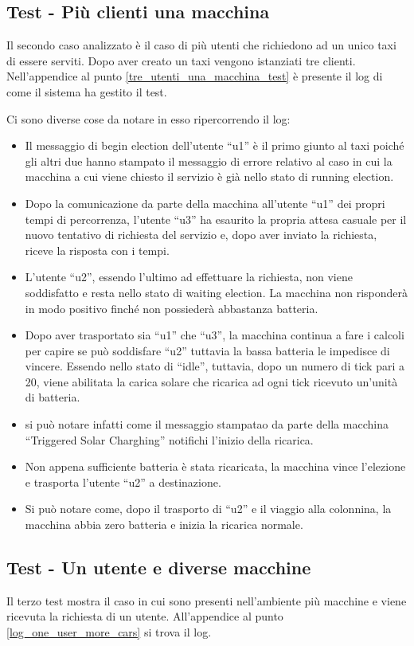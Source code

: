 \subsection{Test - Più clienti una macchina}
Il secondo caso analizzato è il caso di più utenti che richiedono ad un unico taxi di essere serviti. Dopo aver creato un taxi vengono istanziati tre clienti. Nell'appendice al punto \ref{tre_utenti_una_macchina_test} è presente il log di come il sistema ha gestito il test. 

Ci sono diverse cose da notare in esso ripercorrendo il log:
\begin{itemize}
	\item Il messaggio di begin election dell'utente ``u1'' è il primo giunto al taxi poiché gli altri due hanno stampato il messaggio di errore relativo al caso in cui la macchina a cui viene chiesto il servizio è già nello stato di running election.
	\item Dopo la comunicazione da parte della macchina all'utente ``u1'' dei propri tempi di percorrenza, l'utente ``u3'' ha esaurito la propria attesa casuale per il nuovo tentativo di richiesta del servizio e, dopo aver inviato la richiesta, riceve la risposta con i tempi. 
	\item L'utente ``u2'', essendo l'ultimo ad effettuare la richiesta, non viene soddisfatto e resta nello stato di waiting election. La macchina non risponderà in modo positivo finché non possiederà abbastanza batteria.
	\item Dopo aver trasportato sia ``u1'' che ``u3'', la macchina continua a fare i calcoli per capire se può soddisfare ``u2'' tuttavia la bassa batteria le impedisce di vincere. Essendo nello stato di ``idle'', tuttavia, dopo un numero di tick pari a 20, viene abilitata la carica solare che ricarica ad ogni tick ricevuto un'unità di batteria.
	\item si può notare infatti come il messaggio stampatao da parte della macchina ``Triggered Solar Charghing'' notifichi l'inizio della ricarica.
	\item Non appena sufficiente batteria è stata ricaricata, la macchina vince l'elezione e trasporta l'utente ``u2'' a destinazione.
	\item Si può notare come, dopo il trasporto di ``u2'' e il viaggio alla colonnina, la macchina abbia zero batteria e inizia la ricarica normale.
\end{itemize}

\subsection{Test - Un utente e diverse macchine}
Il terzo test mostra il caso in cui sono presenti nell'ambiente più macchine e viene ricevuta la richiesta di un utente. All'appendice al punto \ref{log_one_user_more_cars} si trova il log.

